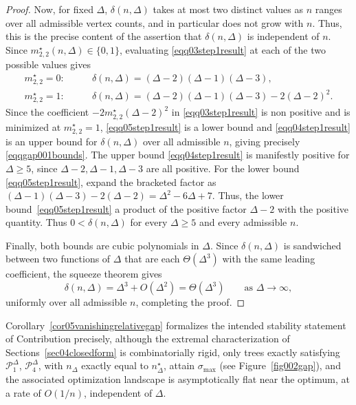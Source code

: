\documentclass[12pt]{amsart}
\begin{document}
\begin{proof}
Now, for fixed $\Delta$, $\delta(n,\Delta)$ takes at most two
distinct values as $n$ ranges over all admissible vertex counts, and in particular does not grow with $n$. Thus, this is the precise content of the assertion that $\delta(n,\Delta)$ is independent of $n$.
Since $m_{2,2}^\star(n,\Delta)\in\{0,1\}$, evaluating
\eqref{eqq03step1result} at each of the two possible values gives
\begin{align}
m_{2,2}^\star=0:&\qquad \delta(n,\Delta) = (\Delta-2)(\Delta-1)(\Delta-3),
\label{eqq04step1result}\\
m_{2,2}^\star=1:&\qquad \delta(n,\Delta) = (\Delta-2)(\Delta-1)(\Delta-3) - 2(\Delta-2)^2.
\label{eqq05step1result}
\end{align}
Since the coefficient $-2m_{2,2}^\star(\Delta-2)^2$ in
\eqref{eqq03step1result} is non  positive and is minimized  at
$m_{2,2}^\star=1$, \eqref{eqq05step1result} is a lower bound and
\eqref{eqq04step1result} is an upper bound for $\delta(n,\Delta)$ over all admissible $n$, giving precisely \eqref{eqqgap001bounds}. 
The upper bound \eqref{eqq04step1result} is manifestly
positive for $\Delta\geqslant 5$, since $\Delta-2,\Delta-1,\Delta-3$ are all
positive. For the lower bound \eqref{eqq05step1result}, expand the bracketed factor as $(\Delta-1)(\Delta-3)-2(\Delta-2)=\Delta^2-6\Delta+7$. Thus, the lower bound~\eqref{eqq05step1result} a product of the positive
factor $\Delta-2$ with the positive quantity. Thus
$0 < \delta(n,\Delta)$ for every $\Delta\geqslant 5$ and every admissible $n$.

Finally, both bounds are cubic polynomials in $\Delta$.  Since $\delta(n,\Delta)$ is sandwiched between two functions of $\Delta$ that are each $\Theta(\Delta^3)$ with the same leading coefficient, the squeeze theorem gives
\begin{equation}
\delta(n,\Delta) = \Delta^3 + O(\Delta^2) = \Theta(\Delta^3) \qquad \text{as } \Delta\to\infty,
\end{equation}
uniformly over all admissible $n$, completing the proof.
\end{proof}

Corollary~\ref{cor05vanishingrelativegap} formalizes the intended stability statement of Contribution precisely, although the extremal characterization
of Sections~\ref{sec04closedform} is combinatorially
rigid, only trees exactly satisfying $\mathcal P_1^\Delta$, $\mathcal P_4^\Delta$, with
$n_\Delta$ exactly equal to $n_\Delta^\star$, attain $\sigma_{\max}$ (see Figure~\ref{fig002gap}), and the associated optimization
landscape is asymptotically flat near the optimum, at a rate of $O(1/n)$, independent of $\Delta$.
\end{document}
